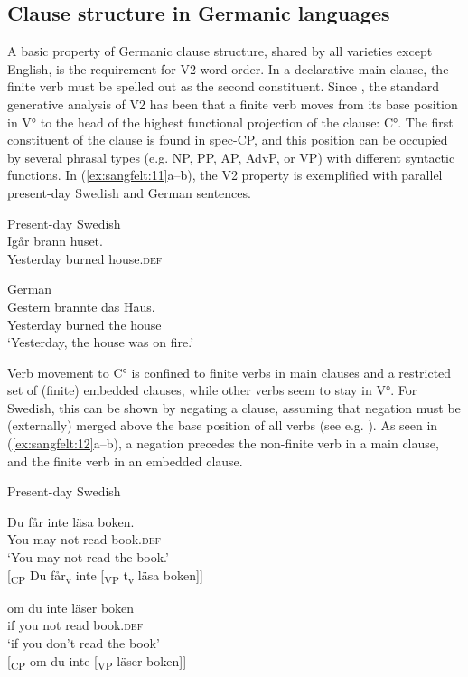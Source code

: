 \documentclass[output=paper, colorlinks, citecolor=brown]{langscibook}
\begin{document}
\subsection{Clause structure in Germanic languages}\label{sec:sangfelt:3.1}

A basic property of Germanic clause structure, shared by all varieties except English, is the requirement for V2 word order. In a declarative main clause, the finite verb must be spelled out as the second constituent. Since \citet{denBesten1983}, the standard generative analysis of V2 has been that a finite verb moves from its base position in V° to the head of the highest functional projection of the clause: C°. The first constituent of the clause is found in spec-CP, and this position can be occupied by several phrasal types (e.g. NP, PP, AP, AdvP, or VP) with different syntactic functions. In (\ref{ex:sangfelt:11}a–b), the V2 property is exemplified with parallel present-day Swedish and German sentences.

\ea
\label{ex:sangfelt:11}
\begin{multicols}{2}\raggedcolumns
\ea Present-day Swedish\\
\gll Igår brann huset. \\
 Yesterday burned house.\textsc{def}\\\label{ex:sangfelt:11a}\columnbreak
 
\ex German\\
\gll Gestern brannte das Haus.\\
 Yesterday burned the house\\
\glt ‘Yesterday, the house was on fire.’\label{ex:sangfelt:11b}
\z 
\end{multicols}
\z 

Verb movement to C° is confined to finite verbs in main clauses and a restricted set of (finite) embedded clauses, while other verbs seem to stay in V°. For Swedish, this can be shown by negating a clause, assuming that negation must be (externally) merged above the base position of all verbs (see e.g. \citealt{Zeijlstra2013}). As seen in (\ref{ex:sangfelt:12}a–b), a negation precedes the non-finite verb in a main clause, and the finite verb in an embedded clause.


\ea Present-day Swedish\label{ex:sangfelt:12}
\begin{multicols}{2}\raggedcolumns
\ea \label{ex:sangfelt:12a}
\gll Du får inte läsa boken. \\
 You may not read book.\textsc{def}\\
\glt ‘You may not read the book.’\\

[\textsubscript{CP} Du får\textsubscript{v} inte [\textsubscript{VP} t\textsubscript{v} läsa boken]]\columnbreak

\ex\label{ex:sangfelt:12b}
\gll om du inte läser boken \\ 
 if you not read book.\textsc{def}\\
\glt ‘if you don’t read the book’\\

[\textsubscript{CP} om du inte [\textsubscript{VP} läser boken]]
\z 
\end{multicols}
\z 
\end{document}
